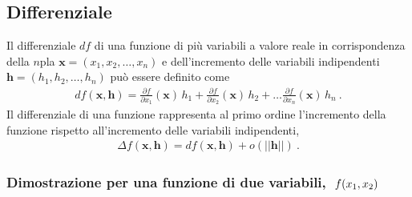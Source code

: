 \documentclass[letterpaper,10pt,italian]{jupyterBook}
\begin{document}
\subsection{Differenziale}
\label{\detokenize{ch/multivariable-calculus/derivatives:differenziale}}
\sphinxAtStartPar
Il differenziale \(d f\) di una funzione di più variabili a valore reale in corrispondenza della \(n\)\sphinxhyphen{}pla \(\mathbf{x} = (x_1, x_2, \dots, x_n)\) e dell’incremento delle variabili indipendenti \(\mathbf{h} = (h_1, h_2, \dots, h_n)\) può essere definito come
\begin{equation*}
\begin{split}d f (\mathbf{x}, \mathbf{h}) = \frac{\partial f}{\partial x_1}(\mathbf{x}) \,  h_1 +   
                                 \frac{\partial f}{\partial x_2}(\mathbf{x}) \,  h_2 + \dots
                                 \frac{\partial f}{\partial x_n}(\mathbf{x}) \,  h_n \ .  \end{split}
\end{equation*}
\sphinxAtStartPar
Il differenziale di una funzione rappresenta al primo ordine l’incremento della funzione rispetto all’incremento delle variabili indipendenti,
\begin{equation*}
\begin{split} \Delta f(\mathbf{x}, \mathbf{h}) = df(\mathbf{x}, \mathbf{h}) + o(||\mathbf{h}||)\ .\end{split}
\end{equation*}\subsubsection*{Dimostrazione per una funzione di due variabili, \protect\(\ f(x_1, x_2) \protect\)}
\end{document}
